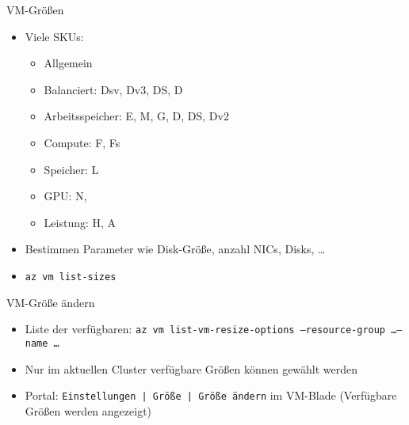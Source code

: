 \begin{flashcard}[Definition]{VM-Größen}
    \begin{itemize}
        \item Viele SKUs:
            \begin{itemize}
                \item Allgemein
                \item Balanciert: Dsv, Dv3, DS, D
                \item Arbeitsspeicher: E, M, G, D, DS, Dv2
                \item Compute: F, Fs
                \item Speicher: L
                \item GPU: N,
                \item Leistung: H, A
            \end{itemize}
        \item Bestimmen Parameter wie Disk-Größe, anzahl NICs, Disks, \ldots
        \item \texttt{az vm list-sizes}
    \end{itemize}
\end{flashcard}

\begin{flashcard}[Definition]{VM-Größe ändern}
    \begin{itemize}
        \item Liste der verfügbaren:\newline
            \texttt{az vm list-vm-resize-options --resource-group \ldots --name \ldots}
        \item Nur im aktuellen Cluster verfügbare Größen können gewählt werden
        \item Portal: \texttt{Einstellungen | Größe | Größe ändern} im VM-Blade\newline
            (Verfügbare Größen werden angezeigt)
    \end{itemize}
\end{flashcard}



